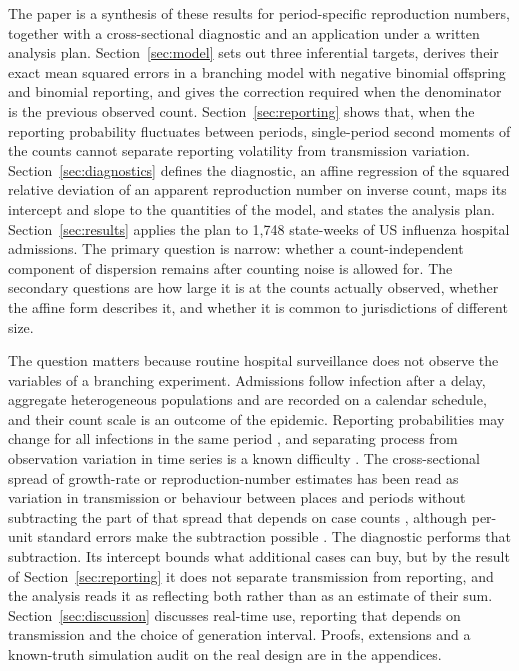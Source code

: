The paper is a synthesis of these results for period-specific reproduction numbers, together with a cross-sectional diagnostic and an application under a written analysis plan. Section~\ref{sec:model} sets out three inferential targets, derives their exact mean squared errors in a branching model with negative binomial offspring and binomial reporting, and gives the correction required when the denominator is the previous observed count. Section~\ref{sec:reporting} shows that, when the reporting probability fluctuates between periods, single-period second moments of the counts cannot separate reporting volatility from transmission variation. Section~\ref{sec:diagnostics} defines the diagnostic, an affine regression of the squared relative deviation of an apparent reproduction number on inverse count, maps its intercept and slope to the quantities of the model, and states the analysis plan. Section~\ref{sec:results} applies the plan to 1,748 state-weeks of US influenza hospital admissions. The primary question is narrow: whether a count-independent component of dispersion remains after counting noise is allowed for. The secondary questions are how large it is at the counts actually observed, whether the affine form describes it, and whether it is common to jurisdictions of different size.

The question matters because routine hospital surveillance does not observe the variables of a branching experiment. Admissions follow infection after a delay, aggregate heterogeneous populations and are recorded on a calendar schedule, and their count scale is an outcome of the epidemic. Reporting probabilities may change for all infections in the same period \citep{azmon2014estimating, stoner2019hierarchical}, and separating process from observation variation in time series is a known difficulty \citep{knape2008estimability, augermethe2016state}. The cross-sectional spread of growth-rate or reproduction-number estimates has been read as variation in transmission or behaviour between places and periods without subtracting the part of that spread that depends on case counts \citep{burghardt2022unequal, biggerstaff2014estimates}, although per-unit standard errors make the subtraction possible \citep{ives2021estimating}. The diagnostic performs that subtraction. Its intercept bounds what additional cases can buy, but by the result of Section~\ref{sec:reporting} it does not separate transmission from reporting, and the analysis reads it as reflecting both rather than as an estimate of their sum. Section~\ref{sec:discussion} discusses real-time use, reporting that depends on transmission and the choice of generation interval. Proofs, extensions and a known-truth simulation audit on the real design are in the appendices.
